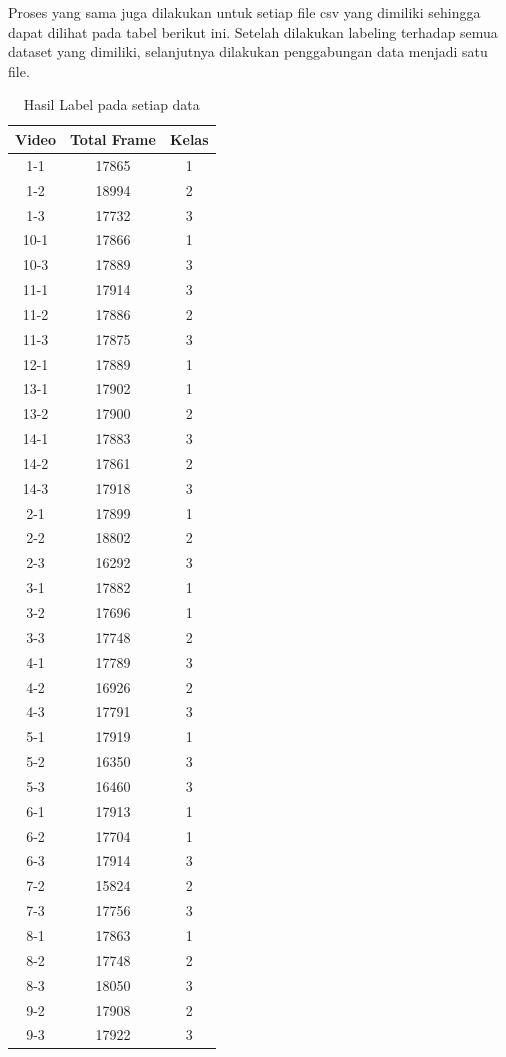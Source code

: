 Proses yang sama juga dilakukan untuk setiap file csv yang dimiliki sehingga dapat dilihat pada tabel berikut ini. Setelah dilakukan labeling terhadap semua dataset yang dimiliki, selanjutnya dilakukan penggabungan data menjadi satu file.

\begin{longtable}{|c|c|c|}
  \caption{Hasil Label pada setiap data}
  \label{tb:HasilEkstraksiPERCLOS}                                   \\
  \hline
  \rowcolor[HTML]{C0C0C0}
  \textbf{Video} & \textbf{Total Frame} & \textbf{Kelas} \\
  \hline
  1-1  & 17865 & 1     \\ 
  1-2 & 18994   & 2 \\ 
  1-3 & 17732  & 3 \\ 
  10-1  & 17866 & 1 \\ 
  10-3 & 17889 & 3 \\ 
  11-1 & 17914 & 3 \\ 
  11-2  & 17886 & 2 \\  
  11-3 & 17875 & 3 \\
  12-1 & 17889 & 1 \\
  13-1  & 17902 & 1 \\
  13-2 & 17900 & 2 \\
  14-1 & 17883  & 3 \\
  14-2  & 17861 & 2 \\
  14-3 & 17918  & 3 \\
  2-1 & 17899  & 1 \\
  2-2  & 18802  & 2 \\
  2-3 & 16292  & 3 \\
  3-1 & 17882 & 1 \\
  3-2  & 17696 & 1 \\
  3-3 & 17748 & 2 \\
  4-1 & 17789 & 3 \\
  4-2  & 16926 & 2 \\
  4-3 & 17791 & 3 \\
  5-1 & 17919  & 1 \\
  5-2  & 16350 & 3 \\
  5-3 & 16460 & 3 \\
  6-1 & 17913 & 1 \\
  6-2 & 17704 & 1 \\
  6-3  & 17914  & 3 \\
  7-2 & 15824 & 2 \\
  7-3 & 17756  & 3 \\
  8-1 & 17863  & 1 \\
  8-2  & 17748  & 2 \\
  8-3 & 18050 & 3 \\
  9-2 & 17908 & 2 \\
  9-3  & 17922  & 3 \\
  \hline
\end{longtable}

